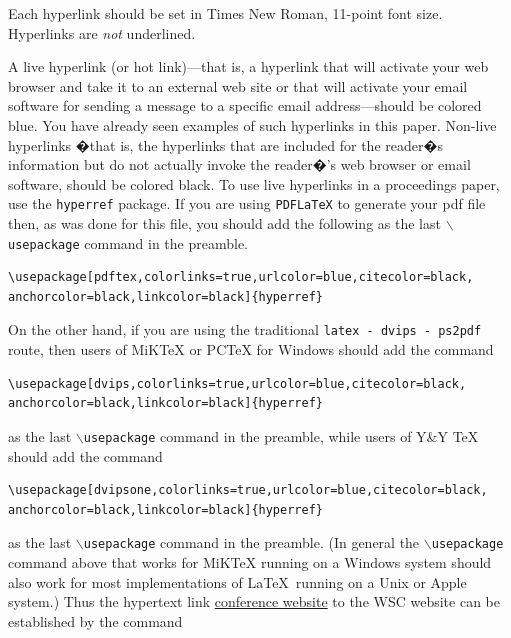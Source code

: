 \documentclass{wscpaperproc}
\theoremstyle{wsc}
\begin{document}
Each hyperlink should be set in Times New Roman, 11-point font size.
Hyperlinks are {\em not} underlined.

A live hyperlink (or hot link)---that is, a hyperlink that will activate your web browser and take it to an external web site or that will activate your email software for sending a message to a specific email address---should be colored blue. You have already seen examples of such hyperlinks in this paper.
Non-live hyperlinks �that is, the hyperlinks that are included for the reader�s information but do not actually invoke the reader�'s web browser or email software, should be colored black.
To use live hyperlinks in a proceedings paper, use the {\tt hyperref} package. If you are using {\tt PDFLaTeX} to generate your pdf file then, as
was done for this file, you should add the following as the last {\tt $\backslash$usepackage} command in the preamble.\newline


\begin{verbatim}
\usepackage[pdftex,colorlinks=true,urlcolor=blue,citecolor=black,
anchorcolor=black,linkcolor=black]{hyperref}
\end{verbatim}\vspace{5 mm}

\noindent On the other hand, if you are using the traditional {\tt latex - dvips - ps2pdf} route, then users of MiKTeX or PCTeX for Windows should add the command\newline


\begin{verbatim}
\usepackage[dvips,colorlinks=true,urlcolor=blue,citecolor=black,
anchorcolor=black,linkcolor=black]{hyperref}
\end{verbatim}\vspace{5 mm}


\noindent as the last {\tt $\backslash$usepackage} command in the preamble, while users of Y\&Y TeX should add the command\newline


\begin{verbatim}
\usepackage[dvipsone,colorlinks=true,urlcolor=blue,citecolor=black,
anchorcolor=black,linkcolor=black]{hyperref}
\end{verbatim}\vspace{5 mm}


\noindent as the last {\tt $\backslash$usepackage} command in the preamble.
(In general the {\tt $\backslash$usepackage} command above that works for MiKTeX running on a Windows system should also work for most implementations of \LaTeX\ running on a Unix or Apple system.)
Thus the hypertext link \href{http://www.wintersim.org}{conference website} \cite{WSC} to the WSC website can be established by the command\newline
\end{document}
